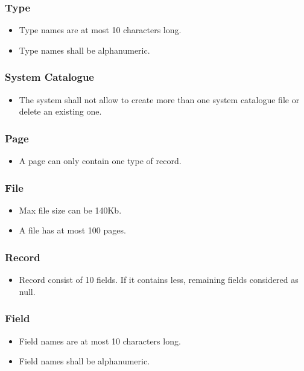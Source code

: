 \documentclass{article}
\begin{document}
        \subsubsection{Type}
            \begin{itemize}
                \item Type names are at most 10 characters long.
                \item Type names shall be alphanumeric.
            \end{itemize}
        \subsubsection{System Catalogue}
            \begin{itemize}
                \item The system shall not allow to create more than one system catalogue file or delete an existing one.
            \end{itemize}
        \subsubsection{Page}
             \begin{itemize}
                \item A page can only contain one type of record.
            \end{itemize}
        \subsubsection{File}
            \begin{itemize}
                \item Max file size can be 140Kb.
                \item A file has at most 100 pages.
            \end{itemize}
        \subsubsection{Record}
            \begin{itemize}
                \item Record consist of 10 fields. If it contains less, remaining fields considered as null.
            \end{itemize}
        \subsubsection{Field}
            \begin{itemize}
                \item Field names are at most 10 characters long.
                \item Field names shall be alphanumeric.
            \end{itemize}
        
\end{document}

